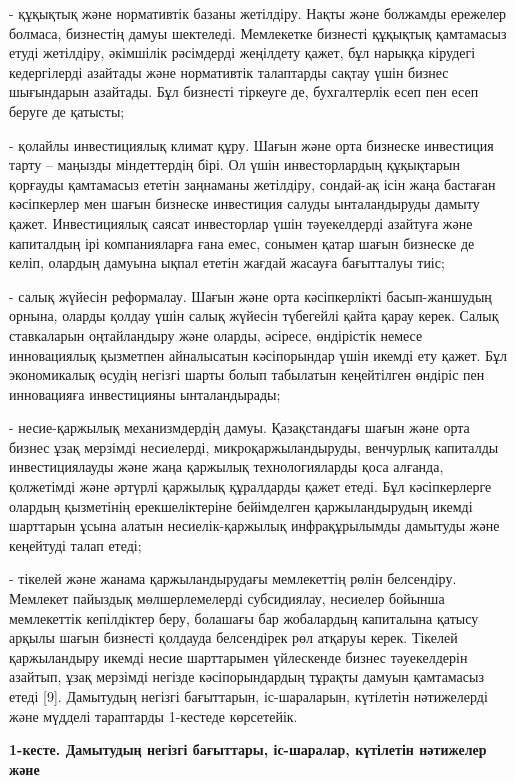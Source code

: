 - құқықтық және нормативтік базаны жетілдіру. Нақты және болжамды
ережелер болмаса, бизнестің дамуы шектеледі. Мемлекетке бизнесті
құқықтық қамтамасыз етуді жетілдіру, әкімшілік рәсімдерді жеңілдету
қажет, бұл нарыққа кірудегі кедергілерді азайтады және нормативтік
талаптарды сақтау үшін бизнес шығындарын азайтады. Бұл бизнесті тіркеуге
де, бухгалтерлік есеп пен есеп беруге де қатысты;

- қолайлы инвестициялық климат құру. Шағын және орта бизнеске инвестиция
тарту -- маңызды міндеттердің бірі. Ол үшін инвесторлардың құқықтарын
қорғауды қамтамасыз ететін заңнаманы жетілдіру, сондай-ақ ісін жаңа
бастаған кәсіпкерлер мен шағын бизнеске инвестиция салуды ынталандыруды
дамыту қажет. Инвестициялық саясат инвесторлар үшін тәуекелдерді
азайтуға және капиталдың ірі компанияларға ғана емес, сонымен қатар
шағын бизнеске де келіп, олардың дамуына ықпал ететін жағдай жасауға
бағытталуы тиіс;

- салық жүйесін реформалау. Шағын және орта кәсіпкерлікті басып-жаншудың
орнына, оларды қолдау үшін салық жүйесін түбегейлі қайта қарау керек.
Салық ставкаларын оңтайландыру және оларды, әсіресе, өндірістік немесе
инновациялық қызметпен айналысатын кәсіпорындар үшін икемді ету қажет.
Бұл экономикалық өсудің негізгі шарты болып табылатын кеңейтілген
өндіріс пен инновацияға инвестицияны ынталандырады;

- несие-қаржылық механизмдердің дамуы. Қазақстандағы шағын және орта
бизнес ұзақ мерзімді несиелерді, микроқаржыландыруды, венчурлық
капиталды инвестициялауды және жаңа қаржылық технологияларды қоса
алғанда, қолжетімді және әртүрлі қаржылық құралдарды қажет етеді. Бұл
кәсіпкерлерге олардың қызметінің ерекшеліктеріне бейімделген
қаржыландырудың икемді шарттарын ұсына алатын несиелік-қаржылық
инфрақұрылымды дамытуды және кеңейтуді талап етеді;

- тікелей және жанама қаржыландырудағы мемлекеттің рөлін белсендіру.
Мемлекет пайыздық мөлшерлемелерді субсидиялау, несиелер бойынша
мемлекеттік кепілдіктер беру, болашағы бар жобалардың капиталына қатысу
арқылы шағын бизнесті қолдауда белсендірек рөл атқаруы керек. Тікелей
қаржыландыру икемді несие шарттарымен үйлескенде бизнес тәуекелдерін
азайтып, ұзақ мерзімді негізде кәсіпорындардың тұрақты дамуын қамтамасыз
етеді {[}9{]}. Дамытудың негізгі бағыттарын, іс-шараларын, күтілетін
нәтижелерді және мүдделі тараптарды 1-кестеде көрсетейік.

{\bfseries 1-кесте. Дамытудың негізгі бағыттары, іс-шаралар, күтілетін
нәтижелер және}

